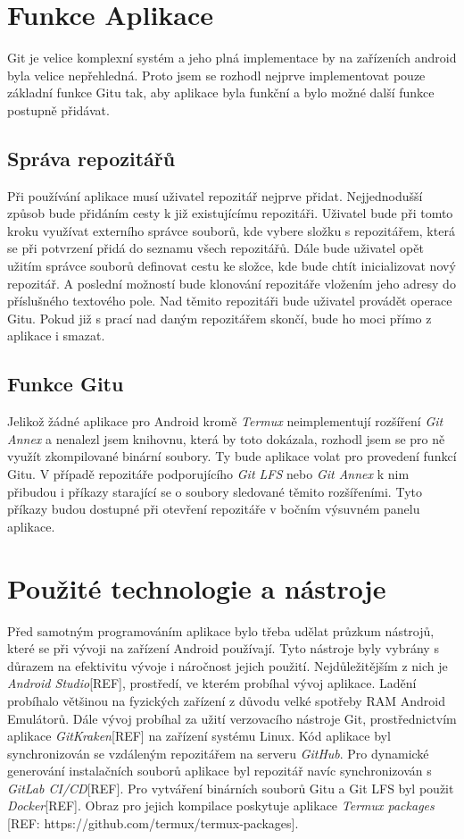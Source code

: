     \section{Funkce Aplikace}
        Git je velice komplexní systém a jeho plná implementace by na zařízeních android byla velice nepřehledná. Proto jsem se rozhodl nejprve implementovat pouze základní funkce Gitu tak, aby aplikace byla funkční a bylo možné další funkce postupně přidávat.

        \subsection{Správa repozitářů}
        Při používání aplikace musí uživatel repozitář nejprve přidat. Nejjednodušší způsob bude přidáním cesty k již existujícímu repozitáři. Uživatel bude při tomto kroku využívat externího správce souborů, kde vybere složku s repozitářem, která se při potvrzení přidá do seznamu všech repozitářů. Dále bude uživatel opět užitím správce souborů definovat cestu ke složce, kde bude chtít inicializovat nový repozitář. A poslední možností bude klonování repozitáře vložením jeho adresy do příslušného textového pole. Nad těmito repozitáři bude uživatel provádět operace Gitu. Pokud již s prací nad daným repozitářem skončí, bude ho moci přímo z aplikace i smazat.

        \subsection{Funkce Gitu}
        Jelikož žádné aplikace pro Android kromě \emph{Termux} neimplementují rozšíření \emph{Git Annex} a nenalezl jsem knihovnu, která by toto dokázala, rozhodl jsem se pro ně využít zkompilované binární soubory. Ty bude aplikace volat pro provedení funkcí Gitu.
        V případě repozitáře podporujícího \emph{Git LFS} nebo \emph{Git Annex} k nim přibudou i příkazy starající se o soubory sledované těmito rozšířeními. Tyto příkazy budou dostupné při otevření repozitáře v bočním výsuvném panelu aplikace.

    \section{Použité technologie a nástroje}
        Před samotným programováním aplikace bylo třeba udělat průzkum nástrojů, které se při vývoji na zařízení Android používají. Tyto nástroje byly vybrány s důrazem na efektivitu vývoje i náročnost jejich použití. Nejdůležitějším z nich je \emph{Android Studio}[REF], prostředí, ve kterém probíhal vývoj aplikace. Ladění probíhalo většinou na fyzických zařízení z důvodu velké spotřeby RAM Android Emulátorů. Dále vývoj probíhal za užití verzovacího nástroje Git, prostřednictvím aplikace \emph{GitKraken}[REF] na zařízení systému Linux. Kód aplikace byl synchronizován se vzdáleným repozitářem na serveru \emph{GitHub}. Pro dynamické generování instalačních souborů aplikace byl repozitář navíc synchronizován s \emph{GitLab CI/CD}[REF]. Pro vytváření binárních souborů Gitu a Git LFS byl použit \emph{Docker}[REF]. Obraz pro jejich kompilace poskytuje aplikace \emph{Termux packages} [REF: https://github.com/termux/termux-packages].

